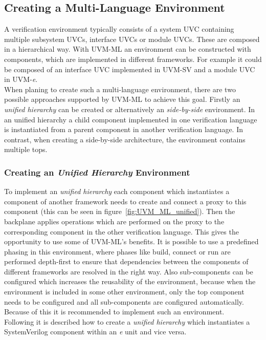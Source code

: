 \subsection{Creating a Multi-Language Environment}
A verification environment typically consists of a system UVC containing
multiple subsystem UVCs, interface UVCs or module UVCs. These are composed in a
hierarchical way. With UVM-ML an environment can be constructed with components,
which are implemented in different frameworks. For example it could be composed
of an interface UVC implemented in UVM-SV and a module UVC in
UVM-\textit{e}. \\
When planing to create such a multi-language environment, there
are two possible approaches supported by UVM-ML to achieve this goal. Firstly an
\emph{unified hierarchy} can be created or alternatively an \emph{side-by-side}
environment. In an unified hierarchy a child component implemented in one
verification language is instantiated from a parent component in another
verification language. In contrast, when creating a side-by-side architecture,
the environment contains multiple tops.

\subsubsection{Creating an \emph{Unified Hierarchy} Environment}
To implement an \emph{unified hierarchy} each component which instantiates a
component of another framework needs to create and connect a proxy to
this component (this can be seen in figure~\ref{fig:UVM_ML_unified}). Then the
backplane applies operations which are performed on the proxy to the
corresponding component in the other verification language. This gives the
opportunity to use some of UVM-ML's benefits. It is possible to use a predefined
phasing in this environment, where phases like build, connect or run are
performed depth-first to ensure that dependencies between the components of
different frameworks are resolved in the right way. Also sub-components can be
configured which increases the reusability of the environment, because when the
environment is included in some other environment, only the top component needs
to be configured and all sub-components are configured automatically. Because of
this it is recommended to implement such an environment.\\
Following it is described how to create a \emph{unified hierarchy} which
instantiates a SystemVerilog component within an \textit{e} unit and vice versa.


